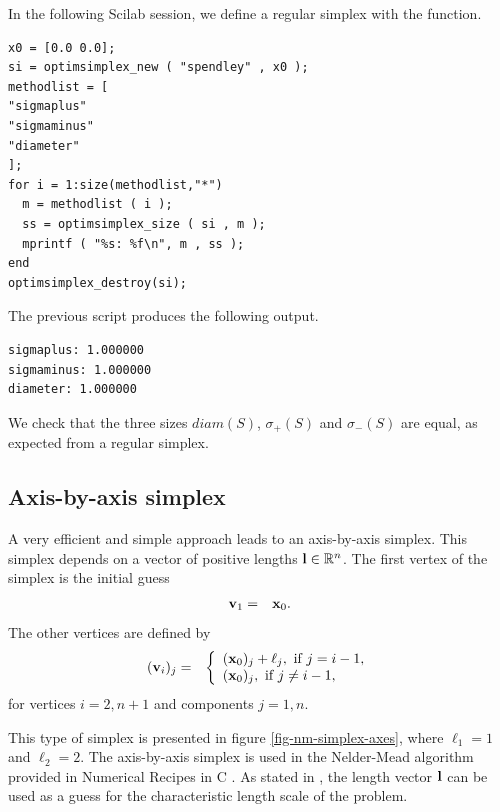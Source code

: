 In the following Scilab session, we define a regular simplex
with the  function.
\lstset{language=scilabscript}
\begin{lstlisting}
x0 = [0.0 0.0];
si = optimsimplex_new ( "spendley" , x0 );
methodlist = [
"sigmaplus" 
"sigmaminus"
"diameter"
];
for i = 1:size(methodlist,"*")
  m = methodlist ( i );
  ss = optimsimplex_size ( si , m );
  mprintf ( "%s: %f\n", m , ss );
end
optimsimplex_destroy(si);
\end{lstlisting}
The previous script produces the following output.
\lstset{language=scilabscript}
\begin{lstlisting}
sigmaplus: 1.000000
sigmaminus: 1.000000
diameter: 1.000000
\end{lstlisting}
We check that the three sizes $diam(S)$, $\sigma_+(S)$
and $\sigma_-(S)$ are equal, as expected from a regular simplex.

\subsection{Axis-by-axis simplex}

A very efficient and simple approach leads to an axis-by-axis simplex.
This simplex depends on a vector of positive lengths $\mathbf{l}\in\mathbb{R}^n$.
The first vertex of the simplex is the initial guess 
\begin{eqnarray}
\mathbf{v}_1 &=& \mathbf{x}_0.
\end{eqnarray}
The other vertices are defined by 
\begin{eqnarray}
(\mathbf{v}_i)_j &=& 
\left\{
\begin{array}{l}
(\mathbf{x}_0)_j + \ell_j, \textrm{ if } j=i-1,\\
(\mathbf{x}_0)_j, \textrm{ if } j\neq i-1,\\
\end{array}
\right.
\end{eqnarray}
for vertices $i=2,n+1$ and components $j=1,n$.

This type of simplex is presented in figure \ref{fig-nm-simplex-axes},
where $\ell_1=1$ and $\ell_2=2$.
The axis-by-axis simplex is used in the Nelder-Mead 
algorithm provided in Numerical Recipes in C \cite{NumericalRecipes}.
As stated in \cite{NumericalRecipes}, the length vector $\mathbf{l}$ can 
be used as a guess for the characteristic length scale of the problem.

